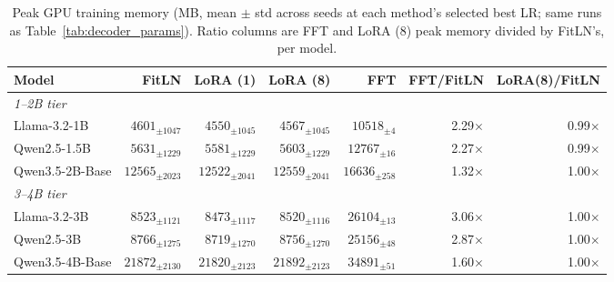 
\begin{table}[t]
\footnotesize
\centering
\begin{tabular}{l | r r r r | r r}
Model & FitLN & LoRA (1) & LoRA (8) & FFT & FFT/FitLN & LoRA(8)/FitLN \\
\toprule
\toprule
\multicolumn{7}{l}{\textit{1--2B tier}}\\
\midrule
Llama-3.2-1B & $4601_{\pm1047}$ & $4550_{\pm1045}$ & $4567_{\pm1045}$ & $10518_{\pm4}$ & 2.29$\times$ & 0.99$\times$ \\
Qwen2.5-1.5B & $5631_{\pm1229}$ & $5581_{\pm1229}$ & $5603_{\pm1229}$ & $12767_{\pm16}$ & 2.27$\times$ & 0.99$\times$ \\
Qwen3.5-2B-Base & $12565_{\pm2023}$ & $12522_{\pm2041}$ & $12559_{\pm2041}$ & $16636_{\pm258}$ & 1.32$\times$ & 1.00$\times$ \\
\midrule
\midrule
\multicolumn{7}{l}{\textit{3--4B tier}}\\
\midrule
Llama-3.2-3B & $8523_{\pm1121}$ & $8473_{\pm1117}$ & $8520_{\pm1116}$ & $26104_{\pm13}$ & 3.06$\times$ & 1.00$\times$ \\
Qwen2.5-3B & $8766_{\pm1275}$ & $8719_{\pm1270}$ & $8756_{\pm1270}$ & $25156_{\pm48}$ & 2.87$\times$ & 1.00$\times$ \\
Qwen3.5-4B-Base & $21872_{\pm2130}$ & $21820_{\pm2123}$ & $21892_{\pm2123}$ & $34891_{\pm51}$ & 1.60$\times$ & 1.00$\times$ \\
\toprule
\end{tabular}
\caption{Peak GPU training memory (MB, mean $\pm$ std across seeds at each method's selected best LR; same runs as Table~\ref{tab:decoder_params}). Ratio columns are FFT and LoRA (8) peak memory divided by FitLN's, per model.}\label{tab:decoder_memory}
\end{table}

